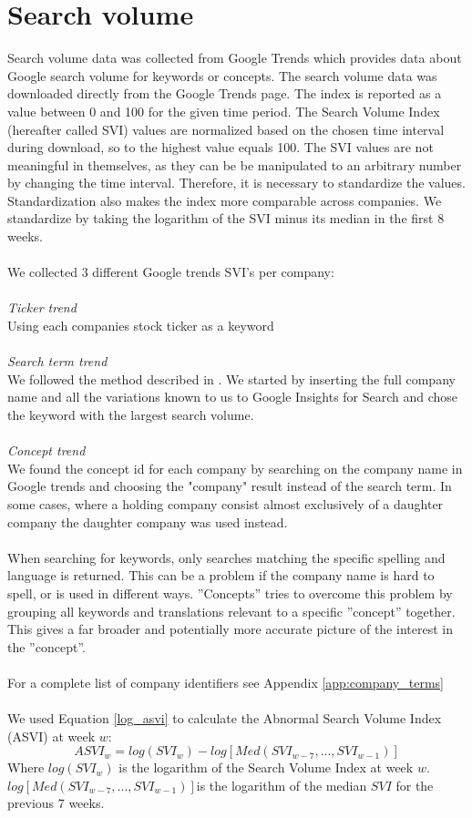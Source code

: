 \section{Search volume}
Search volume data was collected from Google Trends which provides data about Google search volume for keywords or concepts. The search volume data was downloaded directly from the Google Trends page. The index is reported as a value between 0 and 100 for the given time period. The Search Volume Index (hereafter called SVI) values are normalized based on the chosen time interval during download, so to the highest value equals 100. The SVI values are not meaningful in themselves, as they can be be manipulated to an arbitrary number by changing the time interval. Therefore, it is necessary to standardize the values. Standardization also makes the index more comparable across companies. We standardize by taking the logarithm of the SVI minus its median in the first 8 weeks. 
\\\\
We collected 3 different Google trends SVI's per company:
\\\\
\textit{Ticker trend}
\\
Using each companies stock ticker as a keyword
\\\\
\textit{Search term trend}
\\
We followed the method described in  \cite{vlastakis}. We started by inserting the full company name and all the variations known to us to Google Insights for Search and chose the keyword with the largest search volume.
\\\\
\textit{Concept trend}
\\
We found the concept id for each company by searching on the company name in Google trends and choosing the "company" result instead of the search term. In some cases, where a holding company consist almost exclusively of a daughter company the daughter company was used instead.
\\\\
When searching for keywords, only searches matching the specific spelling and language is returned. This can be a problem if the company name is hard to spell, or is used in different ways. ”Concepts” tries to overcome this problem by grouping all keywords and translations relevant to a specific ”concept” together. This gives a far broader and potentially more accurate picture of the interest in the ”concept”.
\\\\
For a complete list of company identifiers see Appendix \ref{app:company_terms}
\\\\
We used Equation \eqref{log_asvi} to calculate the Abnormal Search Volume Index (ASVI) at week $w$:
\begin{equation}
   \label{log_asvi} 
   ASVI_{w} = log(SVI_{w}) - log[Med(SVI_{w-7},...,SVI_{w-1})] 
\end{equation}
Where $log(SVI_{w})$ is the logarithm of the Search Volume Index at week $w$. $log[Med(SVI_{w-7},...,SVI_{w-1})]$is the logarithm of the median $SVI$ for the previous 7 weeks.

